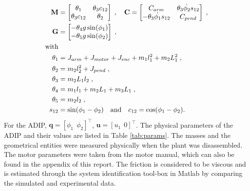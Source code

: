 \begin{align*}
\mathbf{M} &=    \begin{bmatrix}
        \theta_1  & \theta_3c_{12}\\
        \theta_3c_{12} & \theta_2  
\end{bmatrix}\; , \quad
\mathbf{C} = \begin{bmatrix}
C_{arm} & \theta_3\Dot{\phi_2}s_{12}\\
-\theta_3\Dot{\phi_1}s_{12} & C_{pend}
\end{bmatrix}\;,\\
\mathbf{G} &=    \begin{bmatrix}
        -\theta_4g\sin(\phi_1)\\
        -\theta_5g\sin(\phi_2) 
\end{bmatrix}\;, \\
\textup{with}\\
\theta_1 &= J_{arm} + J_{motor} + J_{enc} + m_1l_1^2 + m_2L_1^2 \;,\\
\theta_2 &= m_2l_2^2 + J_{pend} \;,\\
\theta_3 &= m_2L_1l_2 \;,  \\
\theta_4 & = m_1l_1 + m_2L_1 + m_3L_1 \;, \\
\theta_5 &= m_2l_2 \;,\\
s_{12} &= \sin(\phi_1 - \phi_2) \quad \textup{and} \quad c_{12} = \cos(\phi_1 - \phi_2). 
\end{align*}
For the ADIP, $\mathbf{q} = [\phi_1 ~~ \phi_2]^{\top}$, $\mathbf{u} = [u_1 ~~ 0]^{\top}$.
The physical parameters of the ADIP and their values are listed in Table \ref{tab:params}. The masses and the geometrical entities were measured physically when the plant was disassembled. The motor parameters were taken from the motor manual, which can also be found in the appendix of this report. The friction is considered to be viscous and is estimated through the system identification tool-box in Matlab by comparing the simulated and experimental data.
\newpage
